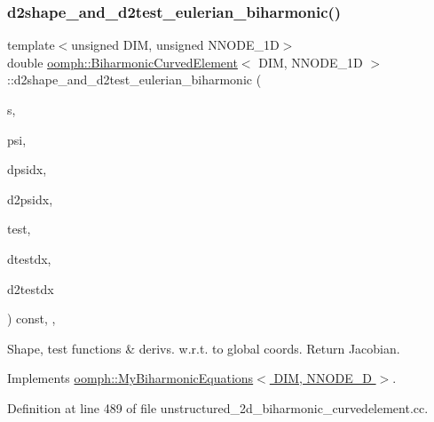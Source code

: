 \subsubsection{\texorpdfstring{d2shape\+\_\+and\+\_\+d2test\+\_\+eulerian\+\_\+biharmonic()}{d2shape\_and\_d2test\_eulerian\_biharmonic()}}
{\footnotesize\ttfamily template$<$unsigned D\+IM, unsigned N\+N\+O\+D\+E\+\_\+1D$>$ \\
double \hyperlink{classoomph_1_1BiharmonicCurvedElement}{oomph\+::\+Biharmonic\+Curved\+Element}$<$ D\+IM, N\+N\+O\+D\+E\+\_\+1D $>$\+::d2shape\+\_\+and\+\_\+d2test\+\_\+eulerian\+\_\+biharmonic (\begin{DoxyParamCaption}\item[{const Vector$<$ double $>$ \&}]{s,  }\item[{Shape \&}]{psi,  }\item[{D\+Shape \&}]{dpsidx,  }\item[{D\+Shape \&}]{d2psidx,  }\item[{Shape \&}]{test,  }\item[{D\+Shape \&}]{dtestdx,  }\item[{D\+Shape \&}]{d2testdx }\end{DoxyParamCaption}) const\hspace{0.3cm}{\ttfamily [inline]}, {\ttfamily [protected]}, {\ttfamily [virtual]}}



Shape, test functions \& derivs. w.\+r.\+t. to global coords. Return Jacobian. 



Implements \hyperlink{classoomph_1_1MyBiharmonicEquations_a4597b3938b6f1244d6e8e0f58250c14a}{oomph\+::\+My\+Biharmonic\+Equations$<$ D\+I\+M, N\+N\+O\+D\+E\+\_\+D $>$}.



Definition at line 489 of file unstructured\+\_\+2d\+\_\+biharmonic\+\_\+curvedelement.\+cc.

\mbox{\label{classoomph_1_1BiharmonicCurvedElement_a41fe37c99757e9da1181e4e769752915}} 
